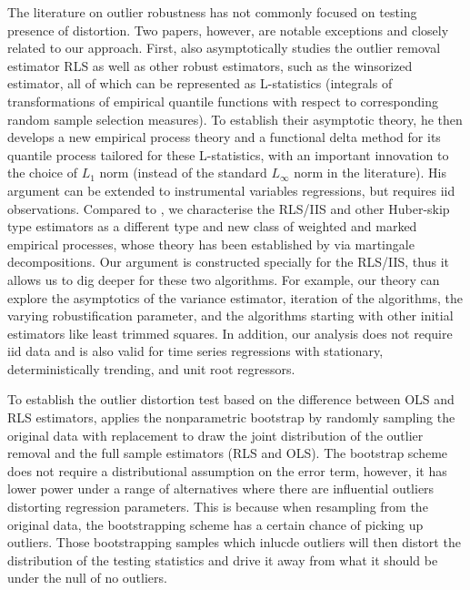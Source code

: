 \documentclass[11pt, letterpaper]{article}
\numberwithin{algorithm}{section}
\numberwithin{assumption}{section}
\numberwithin{lemma}{section}
\numberwithin{theorem}{section}
\numberwithin{corollary}{section}
\numberwithin{remark}{section}
\numberwithin{equation}{section}
\numberwithin{figure}{section}
\numberwithin{table}{section}
\begin{document}
The literature on outlier robustness has not commonly focused on testing presence of distortion. Two papers, however, are notable exceptions and closely related to our approach. First, \cite{kaji2018switching} also asymptotically studies the outlier removal estimator RLS as well as other robust estimators, such as the winsorized estimator, all of which can be represented as L-statistics (integrals of transformations of empirical quantile functions with respect to corresponding random sample selection measures). To establish their asymptotic theory, he then develops a new empirical process theory and a functional delta method for its quantile process tailored for these L-statistics, with an important innovation to the choice of $L_{1}$ norm (instead of the standard $L_{\infty}$ norm in the literature). His argument can be extended to instrumental variables regressions, but requires iid observations. Compared to \cite{kaji2018switching}, we characterise the RLS/IIS and other Huber-skip type estimators as a different type and new class of weighted and marked empirical processes, whose theory has been established by \cite{berenguer2019analysis} via martingale decompositions. Our argument is constructed specially for the RLS/IIS, thus it allows us to dig deeper for these two algorithms. For example, our theory can explore the asymptotics of the variance estimator, iteration of the algorithms, the varying robustification parameter, and the algorithms starting with other initial estimators like least trimmed squares. In addition, our analysis does not require iid data and is also valid for time series regressions with stationary, deterministically trending, and unit root regressors.

To establish the outlier distortion test based on the difference between OLS and RLS estimators, \cite{kaji2018switching} applies the nonparametric bootstrap by randomly sampling the original data with replacement to draw the joint distribution of the outlier removal and the full sample estimators (RLS and OLS). The bootstrap scheme does not require a distributional assumption on the error term, however, it has lower power under a range of alternatives where there are influential outliers distorting regression parameters. This is because when resampling from the original data, the bootstrapping scheme has a certain chance of picking up outliers. Those bootstrapping samples which inlucde outliers will then distort the distribution of the testing statistics and drive it away from what it should be under the null of no outliers.
\end{document}
